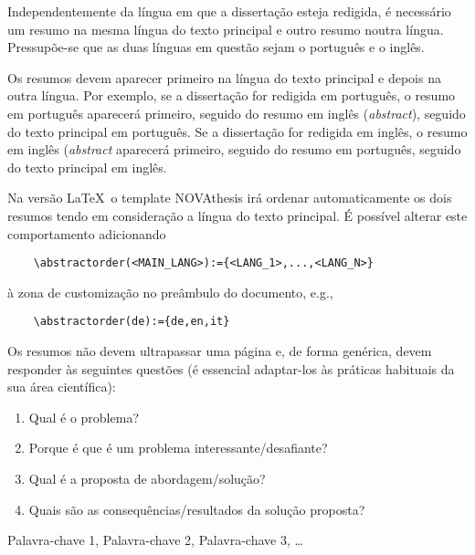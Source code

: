 

Independentemente da língua em que a dissertação esteja redigida, é necessário um resumo na mesma língua do texto principal e outro resumo noutra língua. Pressupõe-se que as duas línguas em questão sejam o português e o inglês.

Os resumos devem aparecer primeiro na língua do texto principal e depois na outra língua. Por exemplo, se a dissertação for redigida em português, o resumo em português aparecerá primeiro, seguido do resumo em inglês (\emph{abstract}), seguido do texto principal em português. Se a dissertação for redigida em inglês, o resumo em inglês (\emph{abstract} aparecerá primeiro, seguido do resumo em português, seguido do texto principal em inglês.

Na versão \LaTeX\, o template NOVAthesis irá ordenar automaticamente os dois resumos tendo em consideração a língua do texto principal. É possível alterar este comportamento adicionando
\begin{verbatim}
    \abstractorder(<MAIN_LANG>):={<LANG_1>,...,<LANG_N>}
\end{verbatim}
\noindent à zona de customização no preâmbulo do documento, e.g.,
\begin{verbatim}
    \abstractorder(de):={de,en,it}
\end{verbatim}

Os resumos não devem ultrapassar uma página e, de forma genérica, devem responder às seguintes questões (é essencial adaptar-los às práticas habituais da sua área científica):

\begin{enumerate}
  \item Qual é o problema?
  \item Porque é que é um problema interessante/desafiante?
  \item Qual é a proposta de abordagem/solução?
  \item Quais são as consequências/resultados da solução proposta?
\end{enumerate}

%
%

\begin{keywords}
Palavra-chave 1, Palavra-chave 2, Palavra-chave 3,  \ldots
\end{keywords}
